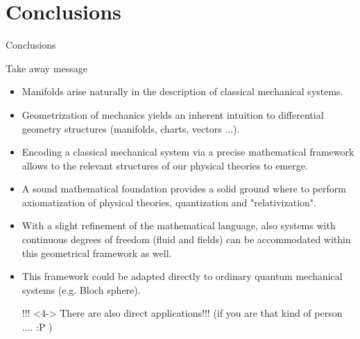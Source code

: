 \documentclass[8pt,handout]{beamer}
\begin{document}
\section{Conclusions}
	\begin{frame}{Conclusions}
		\begin{alertblock}{Take away message}
			\begin{itemize}
				\item<1-> Manifolds arise naturally in the description of classical mechanical systems.
				\item<1-> Geometrization of mechanics yields an inherent intuition to differential geometry structures (manifolds, charts, vectors ...).
				\item<2-> Encoding a classical mechanical system via a precise mathematical framework allows  to the relevant structures of our physical theories to emerge.
				\item<2-> A sound mathematical foundation provides a solid ground where to perform axiomatization of physical theories, quantization and "relativization".
				\item<3-> With a slight refinement of the mathematical language, also systems with continuous degrees of freedom (fluid and fields) can be accommodated within this geometrical framework as well.
				\item<3-> This framework could be adapted directly to ordinary quantum mechanical systems (e.g. Bloch sphere).
			\end{itemize}
		\end{alertblock}
			
			\begin{itemize}
				\item[!!!]<4-> There are also  direct applications!!! (if you are that kind of person .... :P )
			\end{itemize}

				
				
	\end{frame}
\end{document}
